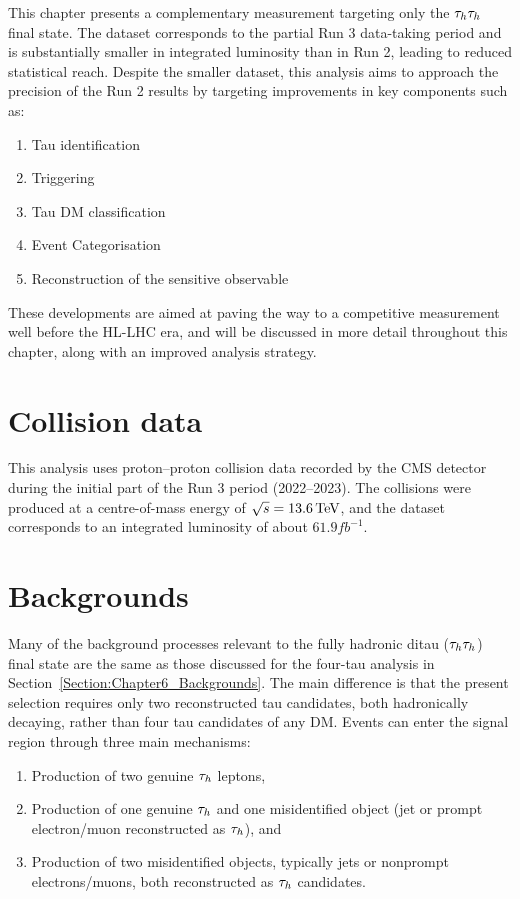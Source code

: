 This chapter presents a complementary measurement targeting only the $\tau_h \tau_h$ final state. The dataset corresponds to the partial Run 3 data-taking period and is substantially smaller in integrated luminosity than in Run 2, leading to reduced statistical reach. Despite the smaller dataset, this analysis aims to approach the precision of the Run 2 results by targeting improvements in key components such as:

\begin{enumerate}[label=(\roman*)]
    \item Tau identification
    \item Triggering
    \item Tau \ac{DM} classification
    \item Event Categorisation
    \item Reconstruction of the sensitive observable
\end{enumerate}

These developments are aimed at paving the way to a competitive measurement well before the \ac{HL}-\ac{LHC} era, and will be discussed in more detail throughout this chapter, along with an improved analysis strategy.

\section{Collision data}

This analysis uses proton–proton collision data recorded by the \ac{CMS} detector during the initial part of the Run 3 period (2022–2023). The collisions were produced at a centre-of-mass energy of $\sqrt{s} = 13.6\,\text{Te\hspace{-.08em}V}$, and the dataset corresponds to an integrated luminosity of about $61.9\unit{fb}^{-1}$.

\section{Backgrounds}
\label{Section:Chapter7_Backgrounds}

Many of the background processes relevant to the fully hadronic ditau ($\tau_h\tau_h$) final state are the same as those discussed for the four-tau analysis in Section~\ref{Section:Chapter6_Backgrounds}. The main difference is that the present selection requires only two reconstructed tau candidates, both hadronically decaying, rather than four tau candidates of any \ac{DM}. Events can enter the signal region through three main mechanisms:  

\begin{enumerate}[label=(\roman*)]
    \item Production of two genuine $\tau_h$ leptons,  
    \item Production of one genuine $\tau_h$ and one misidentified object (jet or prompt electron/muon reconstructed as $\tau_h$), and  
    \item Production of two misidentified objects, typically jets or nonprompt electrons/muons, both reconstructed as $\tau_h$ candidates.  
\end{enumerate}

